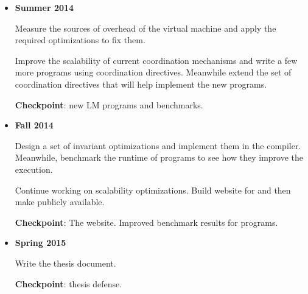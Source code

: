 \begin{itemize}
   \item \textbf{Summer 2014}
   
   Measure the sources of overhead of the virtual machine and apply the required optimizations to fix them.

   Improve the scalability of current coordination mechanisms and write a few more programs using coordination
   directives. Meanwhile extend the set of coordination directives that will help implement the new programs.

   \textbf{Checkpoint}: new LM programs and benchmarks.
   
   \item \textbf{Fall 2014}
   
   Design a set of invariant optimizations and implement them in the compiler. Meanwhile, benchmark the runtime of programs to see how they improve the execution.
   
   Continue working on scalability optimizations.
   Build website for \lang and then make \lang publicly available.
   
   \textbf{Checkpoint}: The \lang website. Improved benchmark results for \lang programs.
   
   \item \textbf{Spring 2015}
   
   Write the thesis document.
   
   \textbf{Checkpoint}: thesis defense.

\end{itemize}

